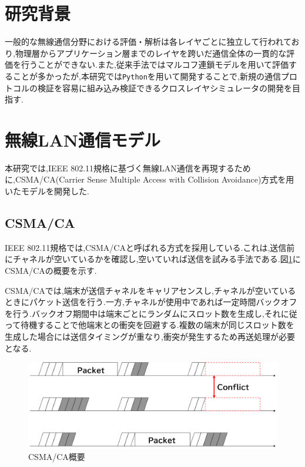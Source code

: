 \documentclass[a4paper, 10pt]{ltjsarticle}
\begin{document}
\section{研究背景}
一般的な無線通信分野における評価・解析は各レイヤごとに独立して行われており,物理層からアプリケーション層までのレイヤを跨いだ通信全体の一貫的な評価を行うことができない.また,従来手法ではマルコフ連鎖モデルを用いて評価することが多かったが,本研究では\texttt{Python}を用いて開発することで,新規の通信プロトコルの検証を容易に組み込み検証できるクロスレイヤシミュレータの開発を目指す.



\section{無線LAN通信モデル}

本研究では,IEEE 802.11規格に基づく無線LAN通信を再現するために,CSMA/CA(Carrier Sense Multiple Access with Collision Avoidance)方式を用いたモデルを開発した.

\subsection{CSMA/CA}

IEEE 802.11規格では,CSMA/CAと呼ばれる方式を採用している.これは,送信前にチャネルが空いているかを確認し,空いていれば送信を試みる手法である.図\ref{CSMA/CA}にCSMA/CAの概要を示す.

CSMA/CAでは,端末が送信チャネルをキャリアセンスし,チャネルが空いているときにパケット送信を行う.一方,チャネルが使用中であれば一定時間バックオフを行う.バックオフ期間中は端末ごとにランダムにスロット数を生成し,それに従って待機することで他端末との衝突を回避する.複数の端末が同じスロット数を生成した場合には送信タイミングが重なり,衝突が発生するため再送処理が必要となる.


\begin{figure}[H]
  \centering
  \includegraphics[width=1\columnwidth]{./assets/csmaca-1.png}
  \caption{CSMA/CA概要}
  \label{CSMA/CA}
\end{figure}
\end{document}
